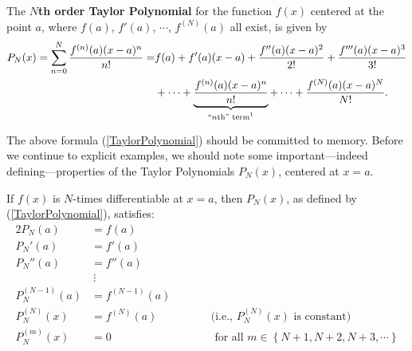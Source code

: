 \begin{definition} 
The {\bf $N$th order Taylor Polynomial}
for the function $f(x)$ centered at the point $a$, where
$f(a)$, $f'(a)$,
$\cdots$, $f^{(N)}(a)$ all exist, is given by\,\footnotemark 
{}
\begin{align}P_N(x)=\sum_{n=0}^N\frac{f^{(n)}(a)(x-a)^n}{n!}  
\notag
=&f(a)+f'(a)(x-a)+\frac{f''(a)(x-a)^2}{2!}+\frac{f'''(a)(x-a)^3}{3!}\\
&+\cdots+
\underbrace{\frac{f^{(n)}(a)(x-a)^n}{n!}}_{\text{``$n${th'' term\footnotemark}}}+\cdots+
\frac{f^{(N)}(a)(x-a)^N}{N!}.\label{TaylorPolynomial}
\end{align} 
\end{definition}
\bigskip
{}
The above formula (\ref{TaylorPolynomial}) should be committed
to memory.  Before we continue to explicit examples,
we should note some important---indeed defining---properties 
of the Taylor Polynomials $P_N(x)$, centered at $x=a$.
\begin{theorem}
If $f(x)$ is $N$-times differentiable at $x=a$, then
$P_N(x)$, as defined by {\rm (\ref{TaylorPolynomial}),} satisfies:
\begin{alignat*}{2}
      P_N(a)&=f(a)\\
      P_N'(a)&=f'(a)\\
      P_N''(a)&=f''(a)\\
         &\ \vdots\\
      P_N^{(N-1)}(a)&=f^{(N-1)}(a)\\
      P_N^{(N)}(x)&=f^{(N)}(a)&\qquad&
              \text{(i.e., } P_N^{(N)}(x)\text{ is constant)}\\
      P_N^{(m)}(x)&=0 &&\text{ for all }m\in\left\{N+1,N+2,N+3,\cdots\right\}
\end{alignat*}
\label{TheoremOnP_N^(K)(a)}
\end{theorem}



